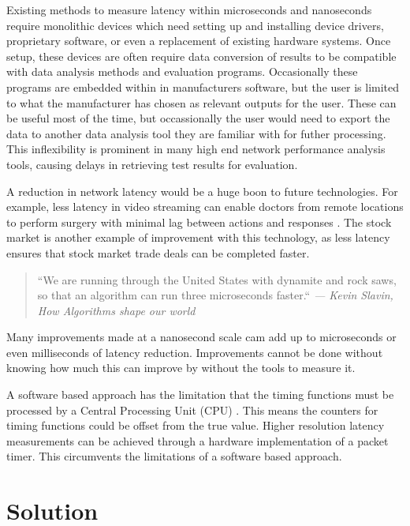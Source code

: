 \par Existing methods to measure latency within microseconds and nanoseconds require monolithic devices which need setting up and installing device drivers, proprietary software, or even a replacement of existing hardware systems.
Once setup, these devices are often require data conversion of results to be compatible with data analysis methods and evaluation programs. 
Occasionally these programs are embedded within in manufacturers software, but the user is limited to what the manufacturer has chosen as relevant outputs for the user.
These can be useful most of the time, but occassionally the user would need to export the data to another data analysis tool they are familiar with for futher processing.
This inflexibility is prominent in many high end network performance analysis tools, causing delays in retrieving test results for evaluation.

\par A reduction in network latency would be a huge boon to future technologies. For example, less
latency in video streaming can enable doctors from remote locations to perform surgery with
minimal lag between actions and responses \cite{remotesurgery}. The stock market is another example of improvement with
this technology, as less latency ensures that stock market trade deals can be completed faster.

\begin{quote}
    \centering
    ``We are running through the United States with dynamite and rock saws, so that an algorithm can
    run three microseconds faster.`` \em --- Kevin Slavin, How Algorithms shape our world \cite{tedTalkAlgorithms}
\end{quote} 

\par Many improvements made at a nanosecond scale cam add up to microseconds or even milliseconds of latency
reduction. Improvements cannot be done without knowing how much this can improve by without the tools to measure it.

\par A software based approach has the limitation that the timing functions must be processed by a
Central Processing Unit (CPU) \cite{CPUtiming}. This means the counters for timing functions could be offset from the true value. Higher
resolution latency measurements can be achieved through a hardware implementation of a packet
timer. This circumvents the limitations of a software based approach.

\section{Solution}

